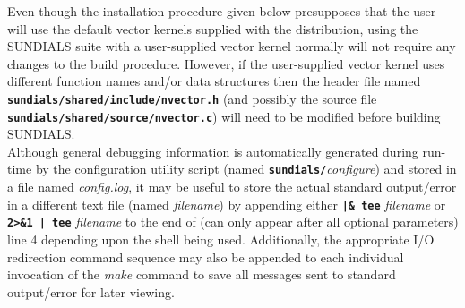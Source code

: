 Even though the installation procedure given below presupposes that the user will use the default vector kernels supplied with the distribution, using the \small SUNDIALS \normalsize suite with a user-supplied vector kernel normally will not require any changes to the build procedure.  However, if the user-supplied vector kernel uses different function names and/or data structures then the header file named \texttt{\textbf{sundials/shared/include/nvector.h}} (and possibly the source file \texttt{\textbf{sundials/shared/source/nvector.c}}) will need to be modified before building \small SUNDIALS\normalsize .
\\

Although general debugging information is automatically generated during run-time by the configuration utility script (named \texttt{\textbf{sundials/}}\textit{configure}) and stored in a file named \textit{config.log}, it may be useful to store the actual standard output/error in a different text file (named \textit{filename}) by appending either \texttt{\textbf{|\& tee}}\textit{ filename} or \texttt{\textbf{2>\&1 | tee}}\textit{ filename} to the end of (can only appear after all optional parameters) line \small 4 \normalsize depending upon the shell being used.  Additionally, the appropriate \small I\normalsize/\small O \normalsize redirection command sequence may also be appended to each individual invocation of the \textit{make} command to save all messages sent to standard output/error for later viewing.
\\

